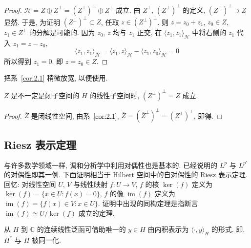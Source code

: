 \begin{proof}
$\mathcal{H} = Z \oplus Z^{\perp} = (Z^{\perp})^{\perp} \oplus Z^{\perp}$ 成立. 由 $Z^{\perp}$, $(Z^{\perp})^{\perp}$ 的定义, $(Z^{\perp})^{\perp} \supset Z$ 显然. 于是, 为证明 $(Z^{\perp})^{\perp} \subset Z$, 任取 $z \in (Z^{\perp})^{\perp}$. 则 $z = z_{0} + z_{1}$, $z_{0} \in Z$, $z_{1} \in Z^{\perp}$ 的分解是可能的. 因为 $z_{0}$, $z$ 均与 $z_{1}$ 正交, 在 $\langle z_{1}, z_{1} \rangle_{\mathcal{H}}$ 中将右侧的 $z_{1}$ 代入 $z_{1} = z - z_{0}$,
\[
\langle z_{1}, z_{1} \rangle_{\mathcal{H}} = \langle z_{1}, z \rangle_{\mathcal{H}} - \langle z_{1}, z_{0} \rangle_{\mathcal{H}} = 0
\]
所以得到 $z_{1} = 0$. 即 $z = z_{0} \in Z$.
\end{proof}

把系~\ref{cor:2.1} 稍微放宽, 以便使用.

\begin{corollary}\label{cor:2.2}
$Z$ 是不一定是闭子空间的 $H$ 的线性子空间时, $(Z^{\perp})^{\perp} = \overline{Z}$ 成立.
\end{corollary}

\begin{proof}
$\overline{Z}$ 是闭线性空间, 由系~\ref{cor:2.1}, $\overline{Z} = (\overline{Z}^{\perp})^{\perp} = (Z^{\perp})^{\perp}$, 即得.
\end{proof}

\subsection*{Riesz 表示定理}

与许多数学领域一样, 调和分析学中利用对偶性也是基本的. 已经说明的 $L^{p}$ 与 $L^{p'}$ 的对偶性即其一例. 下面证明相当于 Hilbert 空间中的自对偶性的 Riesz 表示定理. 回忆: 对线性空间 $U$, $V$ 与线性映射 $f: U \to V$, $f$ 的核 $\ker(f)$ 定义为 $\ker(f) = \{x \in U : f(x) = 0\}$, $f$ 的像 $\operatorname{im}(f)$ 定义为 $\operatorname{im}(f) = \{f(x) \in V : x \in U\}$. 证明中出现的同构定理是指断言 $\operatorname{im}(f) \simeq U/\ker(f)$ 成立的定理.

\begin{theorem}\label{thm:2.30}
从 $H$ 到 $\mathbb{C}$ 的连续线性泛函可借助唯一的 $y \in H$ 由内积表示为 $\langle \cdot, y \rangle_{H}$ 的形式. 即, $H^{*}$ 与 $H$ 被同一化.
\end{theorem}

